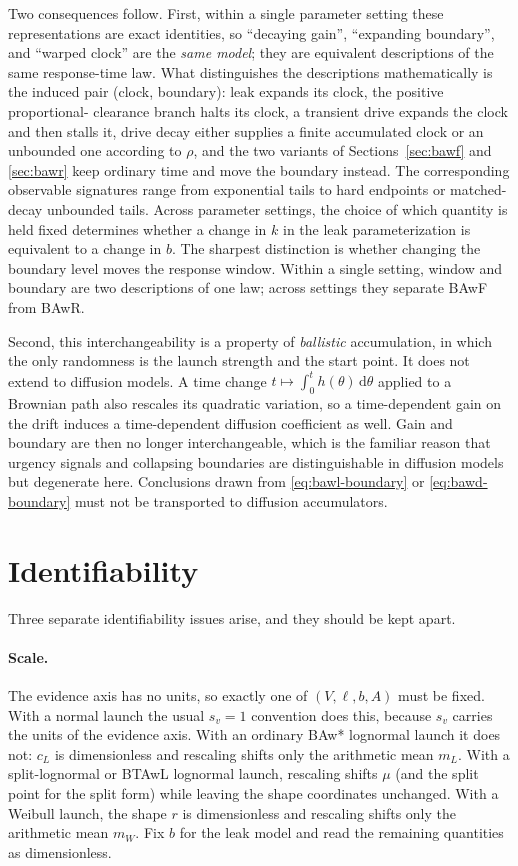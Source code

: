 \documentclass[12pt]{article}
\newcommand{\dd}{\,\mathrm{d}}
\theoremstyle{remark}
\begin{document}
Two consequences follow. First, within a single parameter setting these representations are exact identities, so ``decaying gain'', ``expanding boundary'', and ``warped clock'' are the \emph{same model}; they are equivalent descriptions of the same response-time law. What distinguishes the descriptions mathematically is the induced pair (clock, boundary): leak expands its clock, the positive proportional- clearance branch halts its clock, a transient drive expands the clock and then stalls it, drive decay either supplies a finite accumulated clock or an unbounded one according to $\rho$, and the two variants of Sections~\ref{sec:bawf} and \ref{sec:bawr} keep ordinary time and move the boundary instead. The corresponding observable signatures range from exponential tails to hard endpoints or matched-decay unbounded tails. Across parameter settings, the choice of which quantity is held fixed determines whether a change in $k$ in the leak parameterization is equivalent to a change in $b$. The sharpest distinction is whether changing the boundary level moves the response window. Within a single setting, window and boundary are two descriptions of one law; across settings they separate BAwF from BAwR.

Second, this interchangeability is a property of \emph{ballistic} accumulation, in which the only randomness is the launch strength and the start point. It does not extend to diffusion models. A time change $t \mapsto \int_0^t h(\theta)\dd\theta$ applied to a Brownian path also rescales its quadratic variation, so a time-dependent gain on the drift induces a time-dependent diffusion coefficient as well. Gain and boundary are then no longer interchangeable, which is the familiar reason that urgency signals and collapsing boundaries are distinguishable in diffusion models but degenerate here. Conclusions drawn from \eqref{eq:bawl-boundary} or
\eqref{eq:bawd-boundary} must not be transported to diffusion accumulators.

\section{Identifiability}
\label{sec:identifiability}
Three separate identifiability issues arise, and they should be kept apart.

\paragraph{Scale.} The evidence axis has no units, so exactly one of
$(V, \ell, b, A)$ must be fixed. With a normal launch the usual $s_v = 1$ convention does this, because $s_v$ carries the units of the evidence axis. With an ordinary BAw* lognormal launch it does not: $c_L$ is dimensionless and rescaling shifts only the arithmetic mean $m_L$. With a split-lognormal or BTAwL lognormal launch, rescaling shifts $\mu$ (and the split point for the split form) while leaving the shape coordinates unchanged. With a Weibull launch, the shape $r$ is dimensionless and rescaling shifts only the arithmetic mean $m_W$. Fix $b$ for the leak model and read the remaining quantities as dimensionless.
\end{document}
